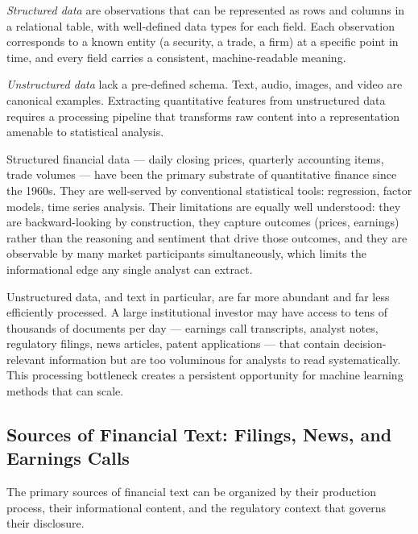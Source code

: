 \begin{definition}
\label{def:structured-data}
\emph{Structured data} are observations that can be represented as rows
and columns in a relational table, with well-defined data types for each
field.  Each observation corresponds to a known entity (a security, a
trade, a firm) at a specific point in time, and every field carries a
consistent, machine-readable meaning.
\end{definition}

\begin{definition}
\label{def:unstructured-data}
\emph{Unstructured data} lack a pre-defined schema.  Text, audio,
images, and video are canonical examples.  Extracting quantitative
features from unstructured data requires a processing pipeline that
transforms raw content into a representation amenable to statistical
analysis.
\end{definition}

Structured financial data --- daily closing prices, quarterly accounting
items, trade volumes --- have been the primary substrate of quantitative
finance since the 1960s.  They are well-served by conventional statistical
tools: regression, factor models, time series analysis.  Their limitations
are equally well understood: they are backward-looking by construction,
they capture outcomes (prices, earnings) rather than the reasoning and
sentiment that drive those outcomes, and they are observable by many
market participants simultaneously, which limits the informational edge
any single analyst can extract.

Unstructured data, and text in particular, are far more abundant and far
less efficiently processed.  A large institutional investor may have access
to tens of thousands of documents per day --- earnings call transcripts,
analyst notes, regulatory filings, news articles, patent applications ---
that contain decision-relevant information but are too voluminous for
analysts to read systematically.  This processing bottleneck creates a
persistent opportunity for machine learning methods that can scale.

\subsection{Sources of Financial Text: Filings, News, and Earnings Calls}
\label{subsec:financial-text-sources}

The primary sources of financial text can be organized by their
production process, their informational content, and the regulatory
context that governs their disclosure.

